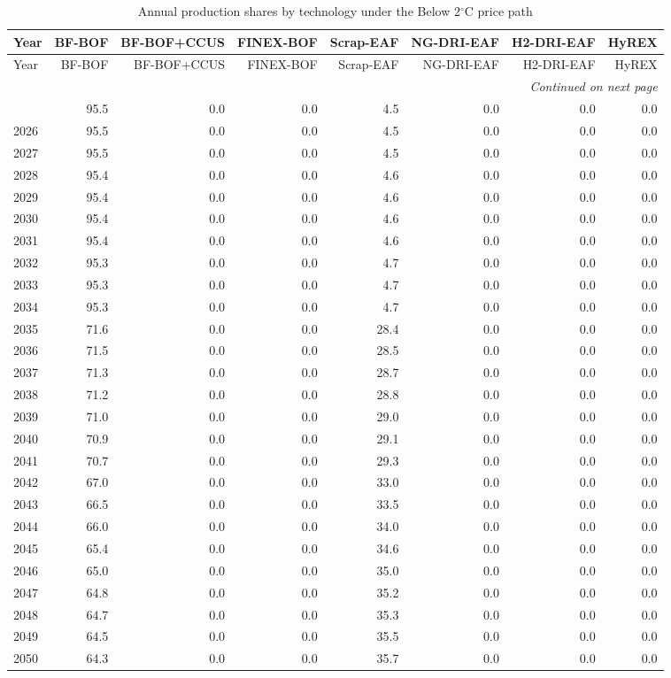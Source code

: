 \begin{longtable}{@{}lrrrrrrr@{}}
\caption{Annual production shares by technology under the Below 2$^\circ$C price path}
\label{tab:annual-shares-ngfs_below2c} \\
\toprule
Year & BF-BOF & BF-BOF+CCUS & FINEX-BOF & Scrap-EAF & NG-DRI-EAF & H2-DRI-EAF & HyREX \\
\midrule
\endfirsthead
\toprule
Year & BF-BOF & BF-BOF+CCUS & FINEX-BOF & Scrap-EAF & NG-DRI-EAF & H2-DRI-EAF & HyREX \\
\midrule
\endhead
\bottomrule \multicolumn{8}{r}{\textit{Continued on next page}} \\
\endfoot
\bottomrule
\endlastfoot
2025 & 95.5 & 0.0 & 0.0 & 4.5 & 0.0 & 0.0 & 0.0 \\
2026 & 95.5 & 0.0 & 0.0 & 4.5 & 0.0 & 0.0 & 0.0 \\
2027 & 95.5 & 0.0 & 0.0 & 4.5 & 0.0 & 0.0 & 0.0 \\
2028 & 95.4 & 0.0 & 0.0 & 4.6 & 0.0 & 0.0 & 0.0 \\
2029 & 95.4 & 0.0 & 0.0 & 4.6 & 0.0 & 0.0 & 0.0 \\
2030 & 95.4 & 0.0 & 0.0 & 4.6 & 0.0 & 0.0 & 0.0 \\
2031 & 95.4 & 0.0 & 0.0 & 4.6 & 0.0 & 0.0 & 0.0 \\
2032 & 95.3 & 0.0 & 0.0 & 4.7 & 0.0 & 0.0 & 0.0 \\
2033 & 95.3 & 0.0 & 0.0 & 4.7 & 0.0 & 0.0 & 0.0 \\
2034 & 95.3 & 0.0 & 0.0 & 4.7 & 0.0 & 0.0 & 0.0 \\
2035 & 71.6 & 0.0 & 0.0 & 28.4 & 0.0 & 0.0 & 0.0 \\
2036 & 71.5 & 0.0 & 0.0 & 28.5 & 0.0 & 0.0 & 0.0 \\
2037 & 71.3 & 0.0 & 0.0 & 28.7 & 0.0 & 0.0 & 0.0 \\
2038 & 71.2 & 0.0 & 0.0 & 28.8 & 0.0 & 0.0 & 0.0 \\
2039 & 71.0 & 0.0 & 0.0 & 29.0 & 0.0 & 0.0 & 0.0 \\
2040 & 70.9 & 0.0 & 0.0 & 29.1 & 0.0 & 0.0 & 0.0 \\
2041 & 70.7 & 0.0 & 0.0 & 29.3 & 0.0 & 0.0 & 0.0 \\
2042 & 67.0 & 0.0 & 0.0 & 33.0 & 0.0 & 0.0 & 0.0 \\
2043 & 66.5 & 0.0 & 0.0 & 33.5 & 0.0 & 0.0 & 0.0 \\
2044 & 66.0 & 0.0 & 0.0 & 34.0 & 0.0 & 0.0 & 0.0 \\
2045 & 65.4 & 0.0 & 0.0 & 34.6 & 0.0 & 0.0 & 0.0 \\
2046 & 65.0 & 0.0 & 0.0 & 35.0 & 0.0 & 0.0 & 0.0 \\
2047 & 64.8 & 0.0 & 0.0 & 35.2 & 0.0 & 0.0 & 0.0 \\
2048 & 64.7 & 0.0 & 0.0 & 35.3 & 0.0 & 0.0 & 0.0 \\
2049 & 64.5 & 0.0 & 0.0 & 35.5 & 0.0 & 0.0 & 0.0 \\
2050 & 64.3 & 0.0 & 0.0 & 35.7 & 0.0 & 0.0 & 0.0 \\
\end{longtable}

